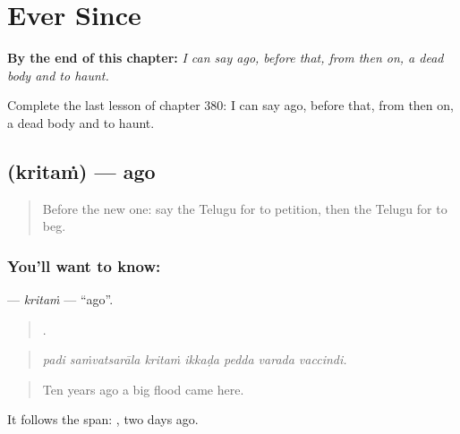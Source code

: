 
\chapter{Ever Since}
\label{ch:te-ever-since}

\begin{chapteropening}
\textbf{By the end of this chapter:} \emph{I can say ago, before that, from then on, a dead body and to haunt.}

Complete the last lesson of chapter 380: I can say ago, before that, from then on, a dead body and to haunt.
\end{chapteropening}

\section[\texorpdfstring{\te{క్రితం} (kritaṁ)}{క్రితం (kritaṁ)}]{ (kritaṁ) — ago}

\label{lesson:TE-C380-kritam}



\begin{quote}
Before the new one: say the Telugu for to petition, then the Telugu for to beg.
\end{quote}

\subsection*{You'll want to know: }
\textbf{} — \emph{kritaṁ} — \textquotedblleft{}ago\textquotedblright{}.

\begin{quote}
      .
\end{quote}

\begin{quote}
\emph{padi saṁvatsarāla kritaṁ ikkaḍa pedda varada vaccindi.}
\end{quote}

\begin{quote}
Ten years ago a big flood came here.
\end{quote}

It follows the span:   , two days ago.

